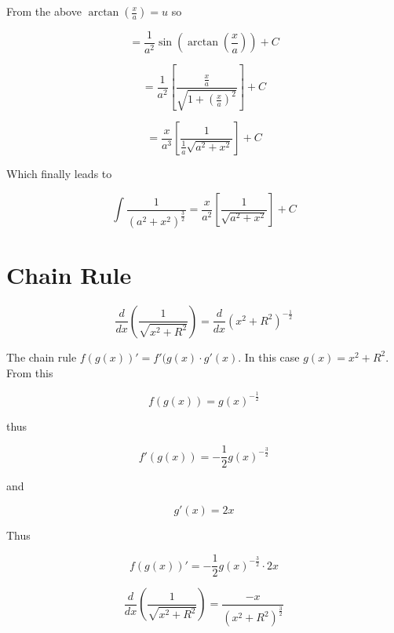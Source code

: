 \documentclass[14pt]{memoir}
\begin{document}
From the above $\arctan{(\frac{x}{a})} = u$ so

\begin{equation}
=  \frac{1}{a^2} \sin{(\arctan{(\frac{x}{a})})} + C
\end{equation}

\begin{equation}
=  \frac{1}{a^2} [\frac{\frac{x}{a}}{\sqrt{1+(\frac{x}{a})^2}}] + C
\end{equation}

\begin{equation}
=  \frac{x}{a^3} [\frac{1}{\frac{1}{a} \sqrt{a^2+x^2}}] + C
\end{equation}

Which finally leads to

\begin{equation}
\int \frac{1}{(a^2 + x^2)^{\frac{3}{2}}} =  \frac{x}{a^2} [\frac{1}{\sqrt{a^2+x^2}}] + C
\end{equation}





\chapter{Chain Rule}

\begin{equation}
\frac{d}{dx} (\frac{1}{\sqrt{x^2+R^2}}) = \frac{d}{dx} (x^2+R^2)^{-\frac{1}{2}} 
\end{equation}

The chain rule $ f(g(x))' = f'(g(x) \cdot g'(x)$. In this case $g(x) = x^2 + R^2$. From this

\begin{equation}
f(g(x)) = g(x)^{-\frac{1}{2}} 
\end{equation}

thus  

\begin{equation}
f'(g(x)) = -\frac{1}{2} g(x)^{-\frac{3}{2}} 
\end{equation}

and

\begin{equation}
g'(x) = 2x
\end{equation}

Thus

\begin{equation}
f(g(x))' =  -\frac{1}{2} g(x)^{-\frac{3}{2}}  \cdot 2x
\end{equation}

\begin{equation}
\frac{d}{dx} (\frac{1}{\sqrt{x^2+R^2}}) = \frac{-x}{(x^2 + R^2)^\frac{3}{2}}
\end{equation}
\end{document}
